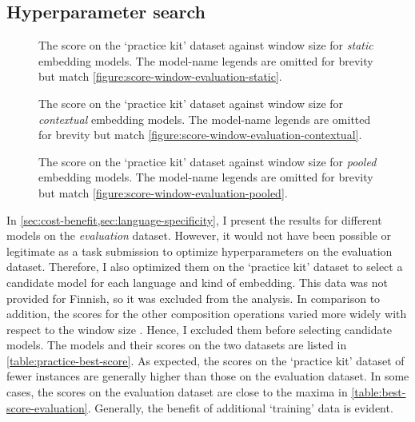 \subsection{Hyperparameter search}
\label{sec:hyperparameter-search}



\begin{figure}
  \centering
  
  \caption{The score on the `practice kit' dataset against window size for \emph{static}
    embedding models.
    The model-name legends are omitted for brevity but match
    \cref{figure:score-window-evaluation-static}.
  }
  \label{figure:score-window-practice-static}
\end{figure}

\begin{figure}
  \centering
  
  \caption{The score on the `practice kit' dataset against window size for
    \emph{contextual} embedding models.
    The model-name legends are omitted for brevity but match
    \cref{figure:score-window-evaluation-contextual}.
  }
  \label{figure:score-window-practice-contextual}
\end{figure}

\begin{figure}
  \centering
  
  \caption{The score on the `practice kit' dataset against window size for \emph{pooled}
    embedding models.
    The model-name legends are omitted for brevity but match
    \cref{figure:score-window-evaluation-pooled}.
  }
  \label{figure:score-window-practice-pooled}
\end{figure}

In \cref{sec:cost-benefit,sec:language-specificity}, I present the results for
different models on the \emph{evaluation} dataset.
However, it would not have been possible or legitimate as a task submission to optimize
hyperparameters on the evaluation dataset.
Therefore, I also optimized them on the `practice kit' dataset
 to select a candidate model for each language and kind
of embedding.
This data was not provided for Finnish, so it was excluded from the analysis.
In comparison to addition, the scores for the other composition operations varied more
widely with respect to the window size
.
Hence, I excluded them before selecting candidate models.
The models and their scores on the two datasets are listed in
\cref{table:practice-best-score}.
As expected, the scores on the `practice kit' dataset of fewer instances are generally
higher than those on the evaluation dataset.
In some cases, the scores on the evaluation dataset are close to the maxima in
\cref{table:best-score-evaluation}.
Generally, the benefit of additional `training' data is evident.

